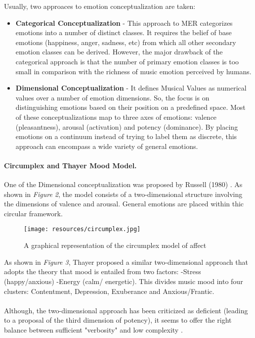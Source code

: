 Usually, two approaces to emotion conceptualization are taken: 

\begin{itemize}
    \item \textbf{Categorical Conceptualization} - This approach to MER categorizes emotions into a number of distinct classes. 
        It requires the belief of base emotions (happiness, anger, sadness, etc) from which all other secondary emotion classes can be derived.\cite{Ekman1992}
        However, the major drawback of the categorical approach is that the number of primary emotion classes is too small in comparison with the richness of music emotion perceived by humans.

    \item \textbf{Dimensional Conceptualization} - It defines Musical Values as numerical values over a number of emotion dimensions. 
        So, the focus is on distinguishing emotions based on their position on a predefined space.
        Most of these conceptualizations map to three axes of emotions: valence (pleasantness), arousal (activation) and potency (dominance).
        By placing emotions on a continuum instead of trying to label them as discrete, this approach can encompass a wide variety of general emotions.

\end{itemize}

\paragraph{Circumplex and Thayer Mood Model.}

One of the Dimensional conceptualization was proposed by Russell (1980) \cite{Russell1980}.
As shown in \textit{Figure 2}, the model consists of a two-dimensional structure involving the dimensions of valence and arousal. 
General emotions are placed within thic circular framework.

\begin{figure}[hlvt!]
        \centering
        \texttt{[image: resources/circumplex.jpg]}
        \caption{A graphical representation of the circumplex model of affect }
        \label{fig:figure2}
\end{figure}

As shown in \textit{Figure 3}, Thayer \cite{Thayer1990} proposed a similar two-dimensional approach that adopts the theory that mood is entailed from two factors: -Stress (happy/anxious) -Energy (calm/ energetic). 
This divides music mood into four clusters: Contentment, Depression, Exuberance and Anxious/Frantic.\\
\\
Although, the two-dimensional approach has been criticized as deficient (leading to a proposal of the third dimension of potency), it seems to offer the right balance between sufficient "verbosity" and low complexity \cite{Juslin2001}.

